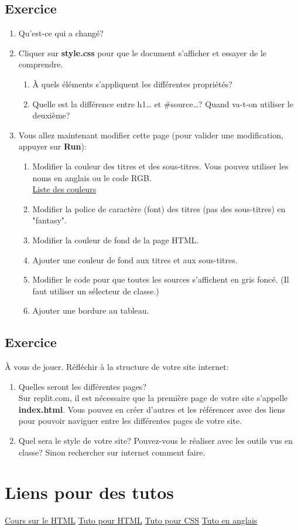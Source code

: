 \documentclass[a4paper,11pt]{article}
\begin{document}
\subsection{Exercice}
\begin{enumerate}
\item Qu'est-ce qui a changé?
\item Cliquer sur \textbf{style.css} pour que le document s'afficher et essayer de le comprendre.
\begin{enumerate}
  \item À quels éléments s'appliquent les différentes propriétés?
  \item Quelle est la différence entre h1{\dots} et \#source{\dots}? Quand va-t-on utiliser le deuxième?
\end{enumerate}
\item Vous allez maintenant modifier cette page (pour valider une modification, appuyer sur \textbf{Run}):
\begin{enumerate}
  \item Modifier la couleur des titres et des sous-titres. Vous pouvez utiliser les noms en anglais ou le code RGB.\\
  \href{https://www.rapidtables.com/web/color/RGB_Color.html}{Liste des couleurs}
  \item Modifier la police de caractère (font) des titres (pas des sous-titres) en  "fantasy".
  \item Modifier la couleur de fond de la page HTML.
  \item Ajouter une couleur de fond aux titres et aux sous-titres.
  \item Modifier le code pour que toutes les sources s'affichent en gris foncé. (Il faut utiliser un sélecteur de classe.)
  \item Ajouter une bordure au tableau.
\end{enumerate}
\end{enumerate}

\subsection{Exercice}
À vous de jouer. Réfléchir à la structure de votre site internet:
\begin{enumerate}
\item Quelles seront les différentes pages?\\
Sur replit.com, il est nécessaire que la première page de votre site s'appelle \textbf{index.html}. Vous pouvez en créer d'autres et les référencer avec des liens pour pouvoir naviguer entre les différentes pages de votre site.
\item Quel sera le style de votre site? Pouvez-vous le réaliser avec les outils vus en classe? Sinon rechercher sur internet comment faire.
\end{enumerate}

\section{Liens pour des tutos}
\href{../Informatique/HTML}{Cours sur le HTML}
\href{https://developer.mozilla.org/fr/docs/Web/HTML}{Tuto pour HTML}
\href{https://developer.mozilla.org/fr/docs/Web/CSS}{Tuto pour CSS}
\href{https://www.w3schools.com/ }{Tuto en anglais}
\end{document}
